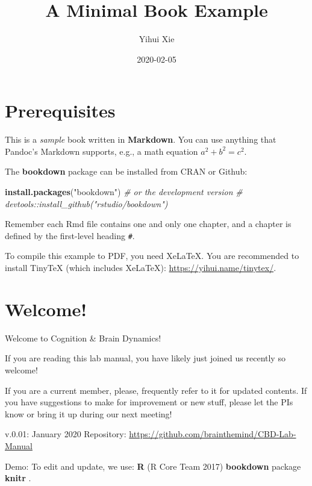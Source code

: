 \documentclass[]{book}
\title{A Minimal Book Example}
\author{Yihui Xie}
\date{2020-02-05}
\newenvironment{Shaded}{\begin{snugshade}}{\end{snugshade}}
\newcommand{\CommentTok}[1]{\textcolor[rgb]{0.56,0.35,0.01}{\textit{#1}}}
\newcommand{\KeywordTok}[1]{\textcolor[rgb]{0.13,0.29,0.53}{\textbf{#1}}}
\newcommand{\NormalTok}[1]{#1}
\newcommand{\StringTok}[1]{\textcolor[rgb]{0.31,0.60,0.02}{#1}}
\begin{document}
\maketitle

{
\setcounter{tocdepth}{1}
\tableofcontents
}
\hypertarget{prerequisites}{%
\chapter{Prerequisites}\label{prerequisites}}

This is a \emph{sample} book written in \textbf{Markdown}. You can use anything that Pandoc's Markdown supports, e.g., a math equation \(a^2 + b^2 = c^2\).

The \textbf{bookdown} package can be installed from CRAN or Github:

\begin{Shaded}
\begin{Highlighting}[]
\KeywordTok{install.packages}\NormalTok{(}\StringTok{"bookdown"}\NormalTok{)}
\CommentTok{# or the development version}
\CommentTok{# devtools::install_github("rstudio/bookdown")}
\end{Highlighting}
\end{Shaded}

Remember each Rmd file contains one and only one chapter, and a chapter is defined by the first-level heading \texttt{\#}.

To compile this example to PDF, you need XeLaTeX. You are recommended to install TinyTeX (which includes XeLaTeX): \url{https://yihui.name/tinytex/}.

\hypertarget{welcome}{%
\chapter{Welcome!}\label{welcome}}

Welcome to Cognition \& Brain Dynamics!

If you are reading this lab manual, you have likely just joined us recently so welcome!

If you are a current member, please, frequently refer to it for updated contents.
If you have suggestions to make for improvement or new stuff, please let the PIs know or bring it up during our next meeting!

v.0.01: January 2020
Repository: \url{https://github.com/brainthemind/CBD-Lab-Manual}

Demo:
To edit and update, we use:
\textbf{R} (R Core Team 2017)
\textbf{bookdown} package \citep{R-bookdown}
\textbf{knitr} \citep{xie2015}.
\end{document}

